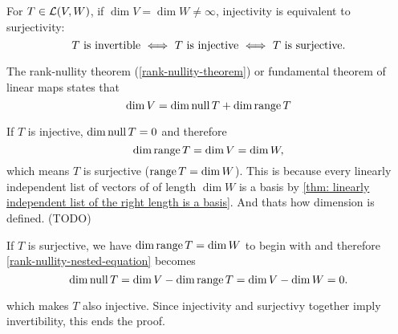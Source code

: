   \setcounter{thm}{64}
  \begin{thm} 
    \label{thm: injectivity is equivalent to surjectivity}
    For $T\in \mathcal{L}(V,W)$, if $\dim V = \dim W \neq \infty$, injectivity is equivalent to surjectivity:
    \begin{equation}
        T$ is invertible $\iff$ $T$ is injective $\iff$ $T$ is surjective.$
    \end{equation}
  \end{thm}
  \begin{prf}
    The rank-nullity theorem (\ref{rank-nullity-theorem}) or fundamental theorem of linear maps states that
    \begin{equation}
      \label{rank-nullity-nested-equation}
      \dim V = \dim \operatorname{null} T + \dim \operatorname{range} T
    \end{equation}

    If $T$ is injective, $\dim \operatorname{null} T = 0$ and therefore
    \begin{equation}
      \dim \operatorname{range} T = \dim V = \dim W,
    \end{equation}
    which means $T$ is surjective ($\operatorname{range} T = \dim W$). This is because every linearly independent list of vectors of of length $\dim W$ is a basis by
    \ref{thm: linearly independent list of the right length is a basis}. And thats how dimension is defined. (TODO)

    If $T$ is surjective, we have $\dim \operatorname{range} T = \dim W$ to begin with and therefore \eqref{rank-nullity-nested-equation} becomes
    \begin{equation}
      \dim \operatorname{null} T = \dim V - \dim \operatorname{range} T = \dim V - \dim W = 0.
    \end{equation}

    which makes $T$ also injective.
    Since injectivity and surjectivy together imply invertibility, this ends the proof.
  \end{prf}



